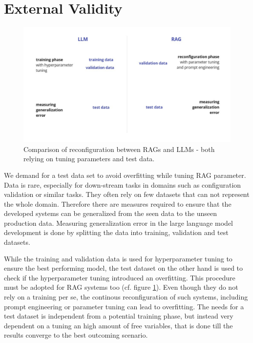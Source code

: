 \section{External Validity}

\begin{figure}
    \centering
    \includegraphics[width=\textwidth]{images/RAGvsLLM-tuning.pdf}
    \caption{Comparison of reconfiguration between RAGs and LLMs - both relying on tuning parameters and test data.}
    \label{fig:tuning}
\end{figure}



We demand for a test data set to avoid overfitting while tuning RAG parameter. Data is rare, especially for down-stream tasks in domains such as configuration validation or similar tasks. They often rely on few datasets that can not represent the whole domain. Therefore there are measures required to ensure that the developed systems can be generalized from the seen data to the unseen production data. Measuring generalization error in the large language model development is done by splitting the data into training, validation and test datasets. 

While the training and validation data is used for hyperparameter tuning to ensure the best performing model, the test dataset on the other hand is used to check if the hyperparameter tuning introduced an overfitting. This procedure must be adopted for RAG systems too (cf. figure \ref{fig:tuning}). Even though they do not rely on a training per se, the continous reconfiguration of such systems, including prompt engineering or parameter tuning can lead to overfitting. The needs for a test dataset is independent from a potential training phase, but instead very dependent on a tuning an high amount of free variables, that is done till the results converge to the best outcoming scenario.

